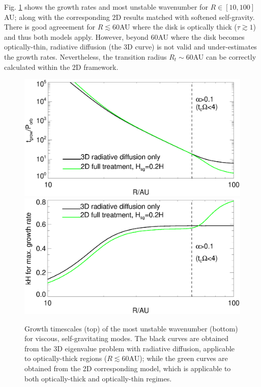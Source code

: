 Fig. \ref{rafikov_growth3d} shows the growth rates and most unstable
wavenumber for $R\in[10,100]$AU; along with the corresponding 2D 
results matched with softened self-gravity. There is good agreeement for
$R\lesssim60$AU where the disk is optically thick ($\tau\gtrsim
1$) and thus both models apply. However, beyond $60$AU where the disk
becomes optically-thin, radiative diffusion (the 3D curve) is not
valid and under-estimates the growth rates. %
Nevertheless, the transition radius
$R_t\sim60$AU can be correctly calculated within the 2D framework.  

\begin{figure}
  \includegraphics[width=\linewidth,clip=true,trim=0cm 1.5cm 0cm
    0.0cm]{figures/ppd_3d_rates}\\
  \includegraphics[width=\linewidth,clip=true,trim=0cm 0cm 0cm
    0.8cm]{figures/ppd_3d_maxk}
  \caption{Growth timescales (top) of the most unstable
    wavenumber (bottom) for viscous, 
    self-gravitating modes. The black curves are obtained
    from the 3D eigenvalue problem with radiative diffusion,
    applicable to optically-thick regions ($R\lesssim 60$AU); 
    while the green curves are obtained from the 2D corresponding
    model, which is applicable to both optically-thick and
    optically-thin regimes.  
    \label{rafikov_growth3d}}
\end{figure}



